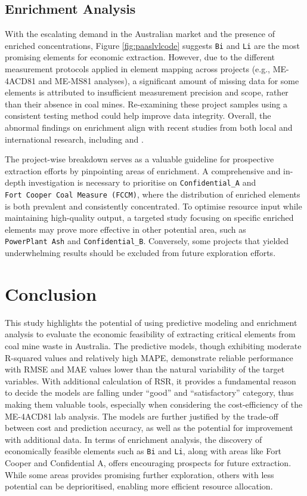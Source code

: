 \documentclass[11pt,a4paper,]{article}
\begin{document}
\subsection{Enrichment Analysis}\label{enrichment-analysis-2}

With the escalating demand in the Australian market and the presence of enriched concentrations, Figure \ref{fig:paaslvlcode} suggests \texttt{Bi} and \texttt{Li} are the most promising elements for economic extraction. However, due to the different measurement protocols applied in element mapping across projects (e.g., ME-4ACD81 and ME-MS81 analyses), a significant amount of missing data for some elements is attributed to insufficient measurement precision and scope, rather than their absence in coal mines. Re-examining these project samples using a consistent testing method could help improve data integrity. Overall, the abnormal findings on enrichment align with recent studies from both local and international research, including \autocite{Sun2010} and \autocite{Hodgkinson2020}.

The project-wise breakdown serves as a valuable guideline for prospective extraction efforts by pinpointing areas of enrichment. A comprehensive and in-depth investigation is necessary to prioritise on \texttt{Confidential\_A} and \texttt{Fort\ Cooper\ Coal\ Measure\ (FCCM)}, where the distribution of enriched elements is both prevalent and consistently concentrated. To optimise resource input while maintaining high-quality output, a targeted study focusing on specific enriched elements may prove more effective in other potential area, such as \texttt{PowerPlant\ Ash} and \texttt{Confidential\_B}. Conversely, some projects that yielded underwhelming results should be excluded from future exploration efforts.

\section{Conclusion}\label{conclusion}

This study highlights the potential of using predictive modeling and enrichment analysis to evaluate the economic feasibility of extracting critical elements from coal mine waste in Australia. The predictive models, though exhibiting moderate R-squared values and relatively high MAPE, demonstrate reliable performance with RMSE and MAE values lower than the natural variability of the target variables. With additional calculation of RSR, it provides a fundamental reason to decide the models are falling under ``good'' and ``satisfactory'' category, thus making them valuable tools, especially when considering the cost-efficiency of the ME-4ACD81 lab analysis. The models are further justified by the trade-off between cost and prediction accuracy, as well as the potential for improvement with additional data. In terms of enrichment analysis, the discovery of economically feasible elements such as \texttt{Bi} and \texttt{Li}, along with areas like Fort Cooper and Confidential A, offers encouraging prospects for future extraction. While some areas provides promising further exploration, others with less potential can be deprioritised, enabling more efficient resource allocation.
\end{document}
